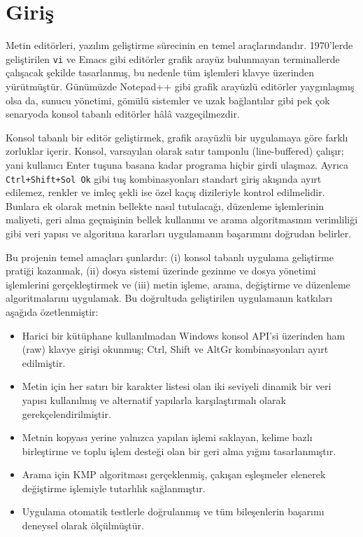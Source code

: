 \documentclass[conference,a4paper]{IEEEtran}
\newcommand{\kod}[1]{\texttt{#1}}
\begin{document}
\section{Giriş}

Metin editörleri, yazılım geliştirme sürecinin en temel araçlarındandır. 1970'lerde geliştirilen \kod{vi} ve Emacs gibi editörler grafik arayüz bulunmayan terminallerde çalışacak şekilde tasarlanmış, bu nedenle tüm işlemleri klavye üzerinden yürütmüştür. Günümüzde Notepad++ \cite{npp} gibi grafik arayüzlü editörler yaygınlaşmış olsa da, sunucu yönetimi, gömülü sistemler ve uzak bağlantılar gibi pek çok senaryoda konsol tabanlı editörler hâlâ vazgeçilmezdir.

Konsol tabanlı bir editör geliştirmek, grafik arayüzlü bir uygulamaya göre farklı zorluklar içerir. Konsol, varsayılan olarak satır tamponlu (line-buffered) çalışır; yani kullanıcı Enter tuşuna basana kadar programa hiçbir girdi ulaşmaz. Ayrıca \kod{Ctrl+Shift+Sol Ok} gibi tuş kombinasyonları standart giriş akışında ayırt edilemez, renkler ve imleç şekli ise özel kaçış dizileriyle kontrol edilmelidir. Bunlara ek olarak metnin bellekte nasıl tutulacağı, düzenleme işlemlerinin maliyeti, geri alma geçmişinin bellek kullanımı ve arama algoritmasının verimliliği gibi veri yapısı ve algoritma kararları uygulamanın başarımını doğrudan belirler.

Bu projenin temel amaçları şunlardır: (i) konsol tabanlı uygulama geliştirme pratiği kazanmak, (ii) dosya sistemi üzerinde gezinme ve dosya yönetimi işlemlerini gerçekleştirmek ve (iii) metin işleme, arama, değiştirme ve düzenleme algoritmalarını uygulamak. Bu doğrultuda geliştirilen uygulamanın katkıları aşağıda özetlenmiştir:

\begin{itemize}
\item Harici bir kütüphane kullanılmadan Windows konsol API'si üzerinden ham (raw) klavye girişi okunmuş; Ctrl, Shift ve AltGr kombinasyonları ayırt edilmiştir.
\item Metin için her satırı bir karakter listesi olan iki seviyeli dinamik bir veri yapısı kullanılmış ve alternatif yapılarla karşılaştırmalı olarak gerekçelendirilmiştir.
\item Metnin kopyası yerine yalnızca yapılan işlemi saklayan, kelime bazlı birleştirme ve toplu işlem desteği olan bir geri alma yığını tasarlanmıştır.
\item Arama için KMP algoritması gerçeklenmiş, çakışan eşleşmeler elenerek değiştirme işlemiyle tutarlılık sağlanmıştır.
\item Uygulama otomatik testlerle doğrulanmış ve tüm bileşenlerin başarımı deneysel olarak ölçülmüştür.
\end{itemize}
\end{document}
